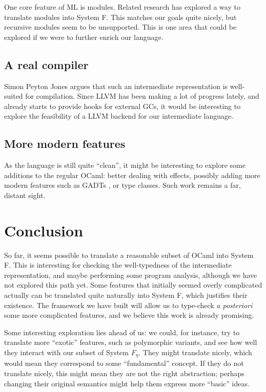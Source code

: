 \documentclass[10pt,a4paper,twoside,titlepage,twocolumn]{article}
\begin{document}
One core feature of ML is modules. Related research \cite{rossberg2010f} has
explored a way to translate modules into System F. This matches our goals quite
nicely, but recursive modules seem to be unsupported. This is one area that
could be explored if we were to further enrich our language.

\subsection{A real compiler}

Simon Peyton Jones argues \cite{sulzmann2007system} that such an intermediate
representation is well-suited for compilation. Since LLVM \cite{llvm} has been
making a lot of progress lately, and already starts to provide hooks for
external GCs, it would be interesting to explore the feasibility of a LLVM
backend for our intermediate language.

\subsection{More modern features}

As the language is still quite ``clean'', it might be interesting to explore
some additions to the regular OCaml: better dealing with effects, possibly
adding more modern features such as GADTs \cite{simonet2004constraint}, or type
classes. Such work remains a far, distant sight.

\section{Conclusion}

So far, it seems possible to translate a reasonable subset of OCaml into System
F. This is interesting for checking the well-typedness of the intermediate
representation, and maybe performing some program analysis, although we have not
explored this path yet. Some features that initially seemed overly complicated
actually can be translated quite naturally into System F, which justifies their
existence. The framework we have built will allow us to type-check \emph{a
posteriori} some more complicated features, and we believe this work is already
promising.

Some interesting exploration lies ahead of us: we could, for instance, try to
translate more ``exotic'' features, such as polymorphic variants, and see how
well they interact with our subset of System $F_\eta$. They might translate
nicely, which would mean they correspond to some ``fundamental'' concept. If
they do not translate nicely, this might mean they are not the right
abstraction; perhaps changing their original semantics might help them express
more ``basic'' ideas.
\end{document}
